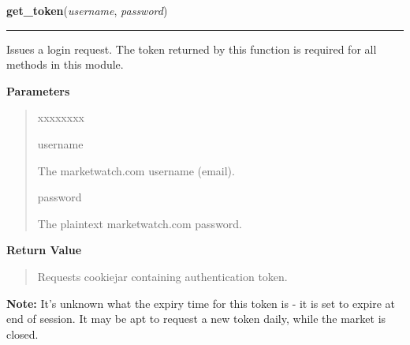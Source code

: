     \vspace{0.5ex}

\hspace{.8\funcindent}\begin{boxedminipage}{\funcwidth}

    \raggedright \textbf{get\_token}(\textit{username}, \textit{password})

    \vspace{-1.5ex}

    \rule{\textwidth}{0.5\fboxrule}
\setlength{\parskip}{2ex}
    Issues a login request. The token returned by this function is required
    for all methods in this module.

\setlength{\parskip}{1ex}
      \textbf{Parameters}
      \vspace{-1ex}

      \begin{quote}
        \begin{Ventry}{xxxxxxxx}

          \item[username]

          The marketwatch.com username (email).

          \item[password]

          The plaintext marketwatch.com password.

        \end{Ventry}

      \end{quote}

      \textbf{Return Value}
    \vspace{-1ex}

      \begin{quote}
      Requests cookiejar containing authentication token.

      \end{quote}

\textbf{Note:} It's unknown what the expiry time for this token is - it is set to expire 
at end of session. It may be apt to request a new token daily, while the 
market is closed.



    \end{boxedminipage}

    \label{moira:get_transaction_history}

    \vspace{0.5ex}

